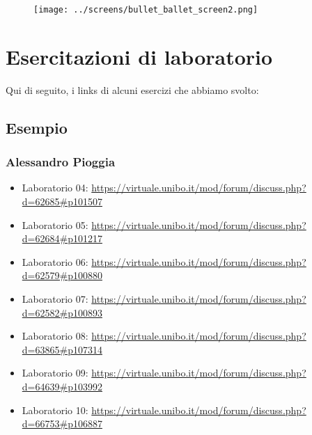 \begin{figure}[H]
	\centering{}
	\texttt{[image: ../screens/bullet\_ballet\_screen2.png]}
	\label{img:bullet_ballet_screen2}
\end{figure}

\begin{comment}
\begin{figure}[H]
	\centering{}
	\texttt{[image: ../screens/bullet\_ballet\_screen6.png]}
	\label{img:bullet_ballet_screen6}
\end{figure}
\end{comment}

\chapter{Esercitazioni di laboratorio}

\textsf{\small Qui di seguito, i links di alcuni esercizi che abbiamo svolto:} \\

\section*{Esempio}

\subsection{Alessandro Pioggia}

\begin{itemize}
	\item Laboratorio 04: \url{https://virtuale.unibo.it/mod/forum/discuss.php?d=62685#p101507}
	\item Laboratorio 05: \url{https://virtuale.unibo.it/mod/forum/discuss.php?d=62684#p101217}
	\item Laboratorio 06: \url{https://virtuale.unibo.it/mod/forum/discuss.php?d=62579#p100880}
	\item Laboratorio 07: \url{https://virtuale.unibo.it/mod/forum/discuss.php?d=62582#p100893}
	\item Laboratorio 08: \url{https://virtuale.unibo.it/mod/forum/discuss.php?d=63865#p107314}
	\item Laboratorio 09: \url{https://virtuale.unibo.it/mod/forum/discuss.php?d=64639#p103992}
	\item Laboratorio 10: \url{https://virtuale.unibo.it/mod/forum/discuss.php?d=66753#p106887}
\end{itemize}

